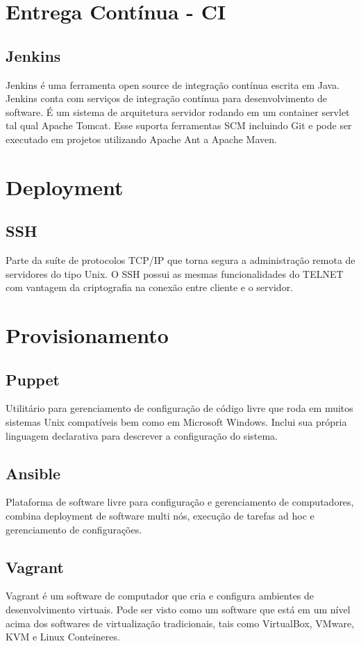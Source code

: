     \section{Entrega Contínua - CI}
	\subsection{Jenkins} Jenkins é uma ferramenta open source de
	integração contínua escrita em Java. Jenkins conta com serviços
	de integração contínua para desenvolvimento de software.
	É um sistema de arquitetura servidor rodando em um container
	servlet tal qual Apache Tomcat. Esse suporta ferramentas SCM
	incluindo Git e pode ser executado em projetos utilizando
	Apache Ant a Apache Maven.

    \section{Deployment}
	\subsection{SSH}Parte da suíte de protocolos TCP/IP que torna
	segura a administração remota de servidores do tipo Unix. O SSH
	possui as mesmas funcionalidades do TELNET com vantagem da
	criptografia na conexão entre cliente e o servidor.

    \section{Provisionamento}

	\subsection{Puppet} Utilitário para gerenciamento de configuração de
	código livre que roda em muitos sistemas Unix compatíveis bem como
	em Microsoft Windows. Inclui sua própria linguagem declarativa para
	descrever a configuração do sistema.

	\subsection{Ansible} Plataforma de software livre para configuração e
	gerenciamento de computadores, combina deployment de software multi
	nós, execução de tarefas ad hoc e gerenciamento de configurações.

	\subsection{Vagrant} Vagrant é um software de computador que cria e
	configura ambientes de desenvolvimento virtuais. Pode ser visto como
	um software que está em um nível acima dos softwares de virtualização
	tradicionais, tais como VirtualBox, VMware, KVM e Linux Conteineres.

